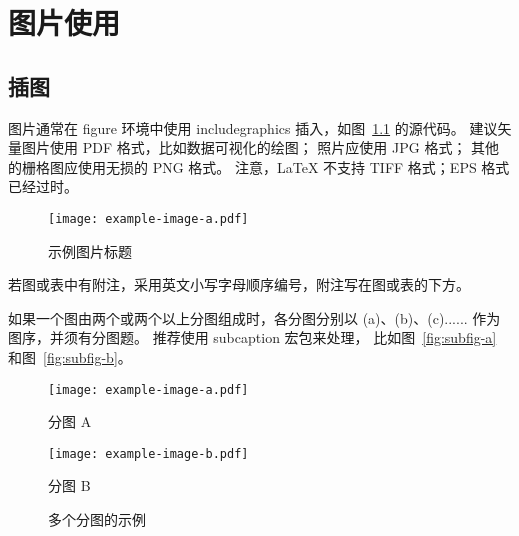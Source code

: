 
\setlength{\baselineskip}{20pt}
\chapter{图片使用}
\section{插图} %

图片通常在 figure 环境中使用 includegraphics 插入，如图~\ref{fig:example} 的源代码。
建议矢量图片使用 PDF 格式，比如数据可视化的绘图；
照片应使用 JPG 格式；
其他的栅格图应使用无损的 PNG 格式。
注意，LaTeX 不支持 TIFF 格式；EPS 格式已经过时。

\begin{figure}[htbp]
	\centering
	\texttt{[image: example-image-a.pdf]}
	\caption{示例图片标题} %
	\label{fig:example} %
\end{figure}

若图或表中有附注，采用英文小写字母顺序编号，附注写在图或表的下方。

如果一个图由两个或两个以上分图组成时，各分图分别以 (a)、(b)、(c)...... 作为图序，并须有分图题。
推荐使用 subcaption 宏包来处理， 比如图~\ref{fig:subfig-a} 和图~\ref{fig:subfig-b}。

\begin{figure}[htbp]
	\centering
	\begin{minipage}{0.44\linewidth}
		\centering
		\texttt{[image: example-image-a.pdf]}
		\caption{分图 A}
		\label{fig:subfig-a}
	\end{minipage}
	\centering
	\begin{minipage}{0.44\linewidth}
		\centering
		\texttt{[image: example-image-b.pdf]}
		\caption{分图 B}
		\label{fig:subfig-b}
	\end{minipage}
	\caption{多个分图的示例}
	\label{fig:multi-image}
\end{figure}